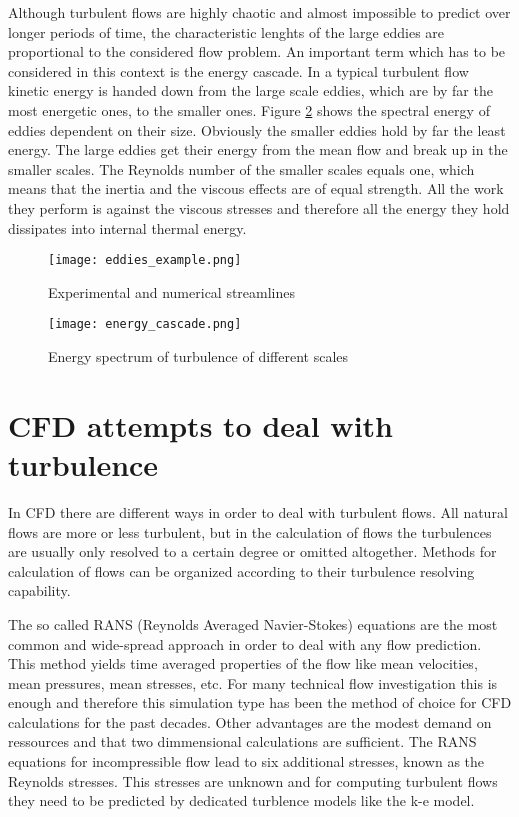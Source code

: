 Although turbulent flows are highly chaotic and almost impossible to predict over longer periods of time, the characteristic lenghts of the large eddies are proportional to the considered flow problem. An important term which has to be considered in this context is the energy cascade. In a typical turbulent flow kinetic energy is handed down from the large scale eddies, which are by far the most energetic ones, to the smaller ones. Figure \ref{fig:cascade} shows the spectral energy of eddies dependent on their size. Obviously the smaller eddies hold by far the least energy. The large eddies get their energy from the mean flow and break up in the smaller scales. The Reynolds number of the smaller scales equals one, which means that the inertia and the viscous effects are of equal strength. All the work they perform is against the viscous stresses and therefore all the energy they hold dissipates into internal thermal energy.

\begin{figure}[h]
\centering
\texttt{[image: eddies\_example.png]}
\caption{Experimental and numerical streamlines}
\label{fig:example}
\end{figure}

\begin{figure}[h]
\centering
\texttt{[image: energy\_cascade.png]}
\caption{Energy spectrum of turbulence of different scales}
\label{fig:cascade}
\end{figure}

\section{CFD attempts to deal with turbulence}
In CFD there are different ways in order to deal with turbulent flows. All natural flows are more or less turbulent, but in the calculation of flows the turbulences are usually only resolved to a certain degree or omitted altogether. Methods for calculation of flows can be organized according to their turbulence resolving capability.

The so called RANS (Reynolds Averaged Navier-Stokes) equations are the most common and wide-spread approach in order to deal with any flow prediction.
This method yields time averaged properties of the flow like mean velocities, mean pressures, mean stresses, etc. For many technical flow investigation this is enough and therefore this simulation type has been the method of choice for CFD calculations for the past decades. Other advantages are the modest demand on ressources and that two dimmensional calculations are sufficient.
The RANS equations for incompressible flow lead to six additional stresses, known as the Reynolds stresses. This stresses are unknown and for computing turbulent flows they need to be predicted by dedicated turblence models like the k-e model.

